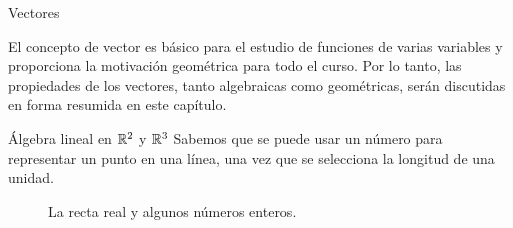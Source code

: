 


\begin{chapter}{Vectores}\label{chap-vectores}

    El concepto de vector es básico para el estudio de funciones de varias variables y proporciona la motivación geométrica para todo el curso. Por lo tanto, las propiedades de los vectores, tanto algebraicas como geométricas, serán discutidas en forma resumida en este capítulo.
    
    \begin{section}{\'Algebra lineal en $\mathbb R^2$ y $\mathbb R^3$}\label{seccion-algebra-lineal-en-R2-yR3}  
        Sabemos que se puede usar un número para representar un punto en una línea, una vez que se selecciona la longitud de una unidad.
        
        \begin{figure}[h]\label{fig-punto-en-R}
            \caption{La recta real y algunos números enteros.}
        \end{figure}


\end{section}
\end{chapter}
